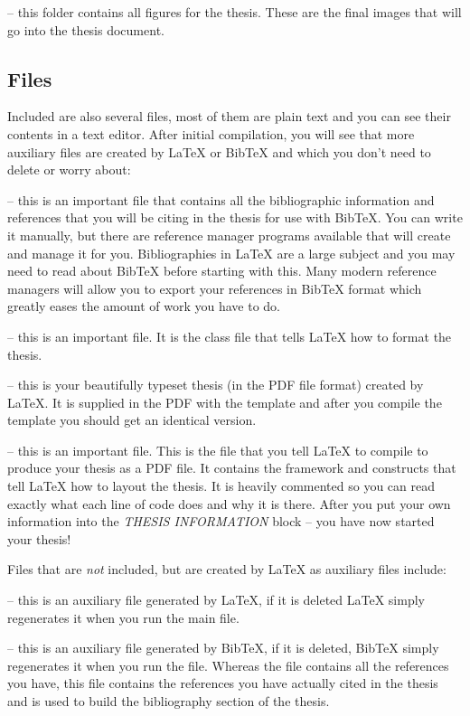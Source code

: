 \documentclass[
12pt, %
english, %
doublespacing, %
nolistspacing, %
liststotoc, %
headsepline, %
chapterinoneline, %
openany, %
]{DoctoralThesis}\usepackage[]{graphicx}\usepackage[]{color}
\begin{document}
 -- this folder contains all figures for the thesis. These are the final images that will go into the thesis document.

\subsection{Files}

Included are also several files, most of them are plain text and you can see their contents in a text editor. After initial compilation, you will see that more auxiliary files are created by \LaTeX{} or BibTeX and which you don't need to delete or worry about:

 -- this is an important file that contains all the bibliographic information and references that you will be citing in the thesis for use with BibTeX. You can write it manually, but there are reference manager programs available that will create and manage it for you. Bibliographies in \LaTeX{} are a large subject and you may need to read about BibTeX before starting with this. Many modern reference managers will allow you to export your references in BibTeX format which greatly eases the amount of work you have to do.

 -- this is an important file. It is the class file that tells \LaTeX{} how to format the thesis. 

 -- this is your beautifully typeset thesis (in the PDF file format) created by \LaTeX{}. It is supplied in the PDF with the template and after you compile the template you should get an identical version.

 -- this is an important file. This is the file that you tell \LaTeX{} to compile to produce your thesis as a PDF file. It contains the framework and constructs that tell \LaTeX{} how to layout the thesis. It is heavily commented so you can read exactly what each line of code does and why it is there. After you put your own information into the \emph{THESIS INFORMATION} block -- you have now started your thesis!

Files that are \emph{not} included, but are created by \LaTeX{} as auxiliary files include:

 -- this is an auxiliary file generated by \LaTeX{}, if it is deleted \LaTeX{} simply regenerates it when you run the main  file.

 -- this is an auxiliary file generated by BibTeX, if it is deleted, BibTeX simply regenerates it when you run the  file. Whereas the  file contains all the references you have, this  file contains the references you have actually cited in the thesis and is used to build the bibliography section of the thesis.
\end{document}

